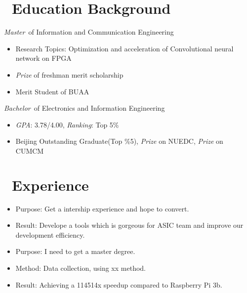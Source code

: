 \documentclass{resume}
\begin{document}
\section{\faGraduationCap\  Education Background}
{\par \textit{Master}\ of Information and Communication Engineering \par}%
\begin{itemize}
  \item Research Topics: Optimization and acceleration of Convolutional neural network on FPGA
  \item \textit{ Prize} of freshman merit scholarship
  \item Merit Student of BUAA
\end{itemize}
{\par \textit{Bachelor}\ of Electronics and Information Engineering \par}%
\begin{itemize}
  \item \textit{GPA}: 3.78/4.00, \textit{Ranking}: Top 5\%
  \item Beijing Outstanding Graduate(Top \%5), \textit{ Prize} on NUEDC, \textit{ Prize} on CUMCM
\end{itemize}

\section{\faUsers\ Experience}
\begin{itemize}
  \item Purpose: Get a intership experience and hope to convert.
  \item Result: Develope a tools which is gorgeous for ASIC team and improve our development efficiency.
\end{itemize}

\begin{itemize}
  \item Purpose: I need to get a master degree.
  \item Method: Data collection, using xx method.
  \item Result: Achieving a 114514x speedup compared to Raspberry Pi 3b.
\end{itemize}
\end{document}
